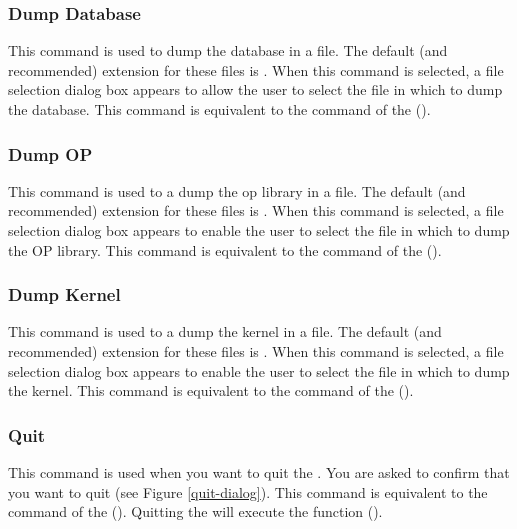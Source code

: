 \subsubsection{Dump Database}

This command is used to dump the database in a file. The default (and
recommended) extension for these files is . When this command is
selected, a file selection dialog box appears to allow the user to select the
file in which to dump the database. This command is equivalent to the
 command of the \CPK{} (). 

\subsubsection{Dump OP}

This command is used to a dump the op library in a file. The default (and
recommended) extension for these files is  . When this command is
selected, a file selection dialog box appears to enable the user to select the
file in which to dump the OP library. This command is equivalent to the
 command of the \CPK{} ().

\subsubsection{Dump Kernel}

This command is used to a dump the kernel in a file. The default (and
recommended) extension for these files is  . When this command is
selected, a file selection dialog box appears to enable the user to select the
file in which to dump the kernel. This command is equivalent to the  command of the \CPK{}
 ().

\subsubsection{\XOPRS{} Quit}


This command is used when you want to quit the \XPK{}.  You are asked to
confirm that you want to quit (see Figure \ref{quit-dialog}). This command is
equivalent to the  command of the \CPK{} (). Quitting the \XPK{} will execute the
 function ().

